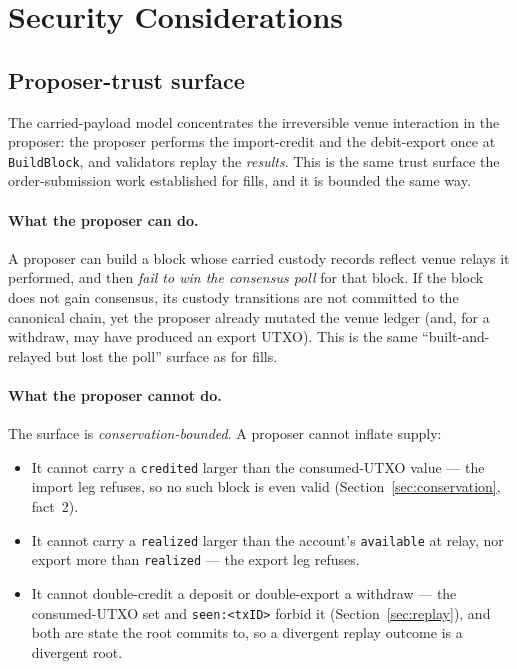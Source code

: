 \section{Security Considerations}
\label{sec:security}

\subsection{Proposer-trust surface}

The carried-payload model concentrates the irreversible venue
interaction in the proposer: the proposer performs the import-credit and
the debit-export once at \texttt{BuildBlock}, and validators replay the
\emph{results}. This is the same trust surface the order-submission work
established for fills, and it is bounded the same way.

\paragraph{What the proposer can do.} A proposer can build a block whose
carried custody records reflect venue relays it performed, and then
\emph{fail to win the consensus poll} for that block. If the block does
not gain consensus, its custody transitions are not committed to the
canonical chain, yet the proposer already mutated the venue ledger (and,
for a withdraw, may have produced an export UTXO). This is the same
``built-and-relayed but lost the poll'' surface as for fills.

\paragraph{What the proposer cannot do.} The surface is
\emph{conservation-bounded}. A proposer cannot inflate supply:

\begin{itemize}[leftmargin=2em,nosep]
\item It cannot carry a \texttt{credited} larger than the consumed-UTXO
  value --- the import leg refuses, so no such block is even valid
  (Section~\ref{sec:conservation}, fact~2).
\item It cannot carry a \texttt{realized} larger than the account's
  \texttt{available} at relay, nor export more than \texttt{realized}
  --- the export leg refuses.
\item It cannot double-credit a deposit or double-export a withdraw ---
  the consumed-UTXO set and \texttt{seen:<txID>} forbid it
  (Section~\ref{sec:replay}), and both are state the root commits to, so
  a divergent replay outcome is a divergent root.
\end{itemize}

